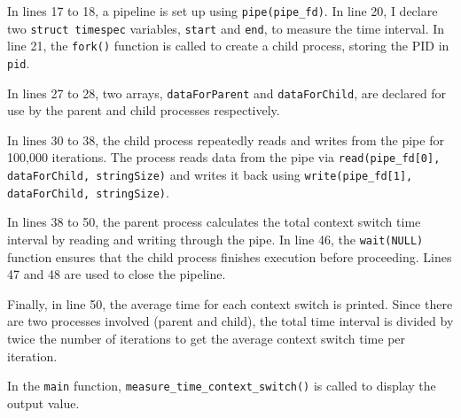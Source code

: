 \documentclass[10pt, answers]{exam}
\begin{document}
\begin{questions}
\begin{solution}
In lines 17 to 18, a pipeline is set up using \texttt{pipe(pipe\_fd)}. In line 20, I declare two \texttt{struct timespec} variables, \texttt{start} and \texttt{end}, to measure the time interval. In line 21, the \texttt{fork()} function is called to create a child process, storing the PID in \texttt{pid}. 

In lines 27 to 28, two arrays, \texttt{dataForParent} and \texttt{dataForChild}, are declared for use by the parent and child processes respectively.

In lines 30 to 38, the child process repeatedly reads and writes from the pipe for 100,000 iterations. The process reads data from the pipe via \texttt{read(pipe\_fd[0], dataForChild, stringSize)} and writes it back using \texttt{write(pipe\_fd[1], dataForChild, stringSize)}. 

In lines 38 to 50, the parent process calculates the total context switch time interval by reading and writing through the pipe. In line 46, the \texttt{wait(NULL)} function ensures that the child process finishes execution before proceeding. Lines 47 and 48 are used to close the pipeline. 

Finally, in line 50, the average time for each context switch is printed. Since there are two processes involved (parent and child), the total time interval is divided by twice the number of iterations to get the average context switch time per iteration.

In the \texttt{main} function, \texttt{measure\_time\_context\_switch()} is called to display the output value.


\end{solution}

\end{questions}
\end{document}
